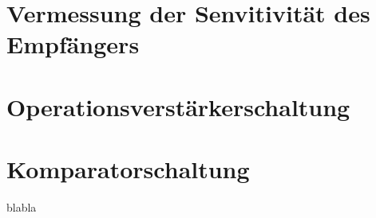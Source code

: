 \section{Vermessung der Senvitivität des Empfängers} %

\section{Operationsverstärkerschaltung} %

\section{Komparatorschaltung} %
blabla
\clearpage